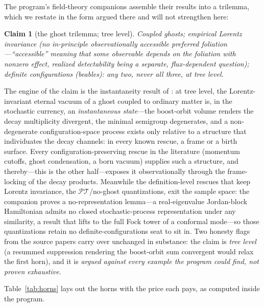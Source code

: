 \documentclass[11pt]{article}
\newcommand{\PT}{\mathcal{PT}}
\newtheorem{claim}{Claim}
\theoremstyle{remark}
\begin{document}
The program's field-theory companions \cite{instantaneous,choosing}
assemble their results into a trilemma, which we restate in the form
argued there and will not strengthen here:

\begin{claim}[the ghost trilemma; tree level]
\label{claim:trilemma}
Coupled ghosts; \emph{empirical} Lorentz invariance (no
\emph{in-principle} observationally accessible preferred
foliation---``accessible'' meaning that some observable depends on the
foliation with nonzero effect, realized detectability being a separate,
flux-dependent question); definite
configurations (beables): any two, never all three, at tree level.
\end{claim}

The engine of the claim is the instantaneity result of
\cite{instantaneous}: at tree level, the Lorentz-invariant eternal
vacuum of a ghost coupled to ordinary matter is, in the stochastic
currency, an \emph{instantaneous state}---the boost-orbit volume
renders the decay multiplicity divergent, the minimal semigroup
degenerates, and a non-degenerate configuration-space process exists
only relative to a structure that individuates the decay channels: in
every known rescue, a frame or a birth surface. Every
configuration-preserving rescue in the literature (momentum cutoffs,
ghost condensation, a born vacuum) supplies such a structure, and
thereby---this is the other half---exposes it observationally through
the frame-locking of the decay products. Meanwhile the
definition-level rescues that keep Lorentz invariance, the
$\PT$/no-ghost quantizations, exit the sample space: the companion
\cite{choosing} proves a no-representation lemma---a real-eigenvalue
Jordan-block Hamiltonian admits no closed stochastic-process
representation under any similarity, a result that lifts to the full
Fock tower of a conformal mode---so those quantizations retain no
definite-configurations seat to sit in. Two honesty flags from the
source papers carry over unchanged in substance: the claim is \emph{tree level}
(a resummed suppression rendering the boost-orbit sum convergent
would relax the first horn), and it is \emph{argued against every
example the program could find, not proven exhaustive}.

Table~\ref{tab:horns} lays out the horns with the price each pays,
as computed inside the program.
\end{document}

